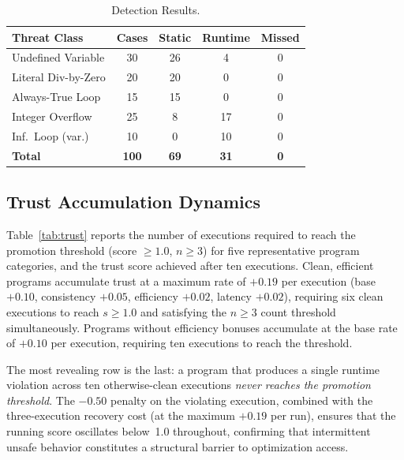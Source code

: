 \documentclass[conference]{IEEEtran}
\begin{document}
\begin{table}[t]
\caption{Detection Results.}
\label{tab:detection}
\centering
\renewcommand{\arraystretch}{1.18}
\small
\begin{tabular}{@{} p{2.3cm} c c c c @{}}
\toprule
\textbf{Threat Class} & \textbf{Cases} &
\textbf{Static} & \textbf{Runtime} & \textbf{Missed} \\
\midrule
Undefined Variable   & 30 & 26 & 4  & 0 \\
Literal Div-by-Zero  & 20 & 20 & 0  & 0 \\
Always-True Loop     & 15 & 15 & 0  & 0 \\
Integer Overflow     & 25 &  8 & 17 & 0 \\
Inf.\ Loop (var.)    & 10 &  0 & 10 & 0 \\
\midrule
\textbf{Total}       & \textbf{100} & \textbf{69} &
\textbf{31} & \textbf{0} \\
\bottomrule
\end{tabular}
\end{table}

\subsection{Trust Accumulation Dynamics}

Table~\ref{tab:trust} reports the number of executions required
to reach the promotion threshold (score $\geq 1.0$, $n \geq 3$)
for five representative program categories, and the trust score
achieved after ten executions. Clean, efficient programs
accumulate trust at a maximum rate of $+0.19$ per execution
(base $+0.10$, consistency $+0.05$, efficiency $+0.02$,
latency $+0.02$), requiring six clean executions to reach
$s \geq 1.0$ and satisfying the $n \geq 3$ count threshold
simultaneously. Programs without efficiency bonuses accumulate
at the base rate of $+0.10$ per execution, requiring ten
executions to reach the threshold.

The most revealing row is the last: a program that produces a single
runtime violation across ten otherwise-clean executions \emph{never
reaches the promotion threshold}. The $-0.50$ penalty on the
violating execution, combined with the three-execution recovery
cost (at the maximum $+0.19$ per run), ensures that the running
score oscillates below~1.0 throughout, confirming that
intermittent unsafe behavior constitutes a structural barrier to
optimization access.
\end{document}
